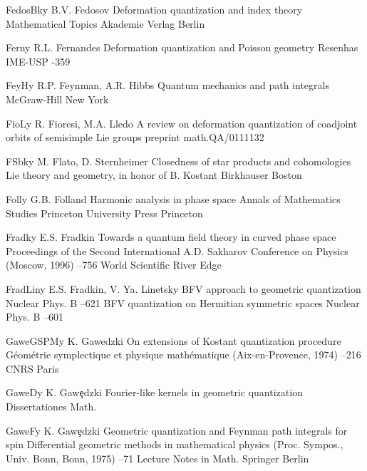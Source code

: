 \documentclass[11pt]{amsart}
\numberwithin{equation}{section}
\theoremstyle{remark}
\newcommand{\by}{\mathbf y}
\begin{document}
\begin{thebibliography}{199}
 FedosBk\by{ B.V. Fedosov \book Deformation quantization and index theory
\bookinfo Mathematical Topics  \publ Akademie Verlag \publaddr Berlin }

 Fern\by{ R.L. Fernandes \paper Deformation quantization and Poisson
geometry \jour Resenhas IME-USP   -359}

 FeyH\by{ R.P. Feynman, A.R. Hibbs \book Quantum mechanics and path
integrals \publ McGraw-Hill \publaddr New York }

 FioL\by{ R. Fioresi, M.A. Lledo \paper A review on deformation
quantization of coadjoint orbits of semisimple Lie groups \paperinfo
preprint math.QA/0111132}

 FSbk\by{ M. Flato, D. Sternheimer \paper Closedness of star products and
cohomologies \inbook Lie theory and geometry, in honor of B. Kostant  \publ Birkhauser \publaddr
Boston }

 Foll\by{ G.B. Folland \book Harmonic analysis in phase space \bookinfo
Annals of Mathematics Studies  \publ Princeton University Press
\publaddr Princeton }

 Fradk\by{ E.S. Fradkin \paper Towards a quantum field theory in curved
phase space \inbook Proceedings of the Second International A.D. Sakharov
Conference on Physics (Moscow, 1996) --756 \publ World Scientific
\publaddr River Edge }

 FradLin\by{ E.S. Fradkin, V. Ya. Linetsky \paper BFV approach to
geometric quantization \jour Nuclear Phys. B   --621
\moreref \paper BFV quantization on Hermitian symmetric spaces \jour Nuclear
Phys. B   --601}

 GaweGSPM\by{ K. Gawedzki \paper On extensions of Kostant quantization
procedure \inbook G\'eom\'etrie symplectique et physique math\'ematique
(Aix-en-Provence, 1974) --216 \publ CNRS \publaddr Paris }

 GaweD\by{ K. Gaw\c{e}dzki \paper Fourier-like kernels in geometric
quantization \jour Dissertationes Math.  }

 GaweF\by{ K. Gaw\c{e}dzki \paper Geometric quantization and Feynman path
integrals for spin \inbook Differential geometric methods in mathematical
physics (Proc. Sympos., Univ. Bonn, Bonn, 1975) --71 \bookinfo Lecture
Notes in Math.  \publ Springer \publaddr Berlin }


\end{thebibliography}
\end{document}
